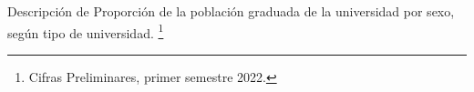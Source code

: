 Descripción de Proporción de la población graduada de la universidad por sexo, según tipo de universidad. \footnote{Cifras Preliminares, primer semestre 2022.}